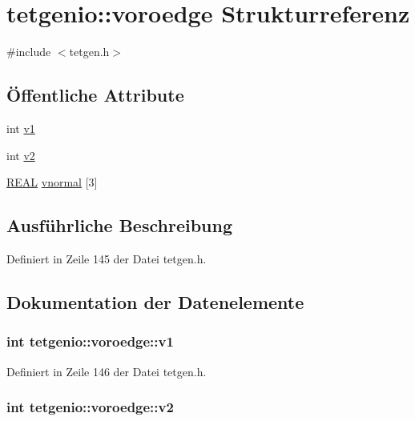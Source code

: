 \hypertarget{structtetgenio_1_1voroedge}{\section{tetgenio\-:\-:voroedge Strukturreferenz}
\label{structtetgenio_1_1voroedge}
}


{\ttfamily \#include $<$tetgen.\-h$>$}

\subsection*{Öffentliche Attribute}
\begin{DoxyCompactItemize}
\item 
int \hyperlink{structtetgenio_1_1voroedge_a2c18bda2392af5f81bc790a2c0ea3139}{v1}
\item 
int \hyperlink{structtetgenio_1_1voroedge_a19a27882ca68a89123965f7b08e05d55}{v2}
\item 
\hyperlink{tetgen_8h_a4b654506f18b8bfd61ad2a29a7e38c25}{R\-E\-A\-L} \hyperlink{structtetgenio_1_1voroedge_afea78ad75784a868068e6d86c21531a3}{vnormal} \mbox{[}3\mbox{]}
\end{DoxyCompactItemize}


\subsection{Ausführliche Beschreibung}


Definiert in Zeile 145 der Datei tetgen.\-h.



\subsection{Dokumentation der Datenelemente}
\hypertarget{structtetgenio_1_1voroedge_a2c18bda2392af5f81bc790a2c0ea3139}{
\subsubsection[{v1}]{\setlength{\rightskip}{0pt plus 5cm}int tetgenio\-::voroedge\-::v1}}\label{structtetgenio_1_1voroedge_a2c18bda2392af5f81bc790a2c0ea3139}


Definiert in Zeile 146 der Datei tetgen.\-h.

\hypertarget{structtetgenio_1_1voroedge_a19a27882ca68a89123965f7b08e05d55}{
\subsubsection[{v2}]{\setlength{\rightskip}{0pt plus 5cm}int tetgenio\-::voroedge\-::v2}}\label{structtetgenio_1_1voroedge_a19a27882ca68a89123965f7b08e05d55}


